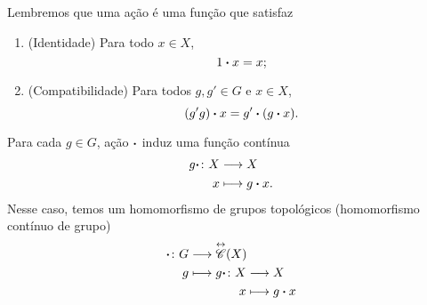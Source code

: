 Lembremos que uma ação é uma função que satisfaz
	\begin{enumerate}
	\item (Identidade) Para todo $x \in X$,
		\begin{equation*}
		1\bm{\cdot} x = x;
		\end{equation*}
	\item (Compatibilidade) Para todos $g,g' \in G$ e $x \in X$,
		\begin{equation*}
		(g'g)\bm{\cdot} x = g'\bm{\cdot}(g\bm{\cdot} x).
		\end{equation*}
	\end{enumerate}

Para cada $g \in G$, ação $\bm{\cdot}$ induz uma função contínua
	\begin{align*}
	{g\bm{\cdot}}\colon {X} &\longrightarrow {X} \\{x} &\longmapsto g\bm{\cdot} x.
	\end{align*}
Nesse caso, temos um homomorfismo de grupos topológicos (homomorfismo contínuo de grupo)
	\begin{align*}
	\func{\pt}{G}{\Iso{\Cont}(X)}{g}{
		\begin{aligned}[t]
		\func{g\pt}{X}{X}{x}{g\pt x}
		\end{aligned}
	}
	\end{align*}

\begin{comment}

\begin{proof}
\begin{enumerate}
	\item [($\Rightarrow$)] Suponhamos que a ação $\fun{\varphi}{G \times X}{X}$ seja contínua e mostremos que a ação $\fun{\phi}{G}{\Iso{\Cont}(X)}$ é contínua. Para isso,
 
	\item [($\Leftarrow$)]
\end{enumerate}
\end{proof}

\end{comment}